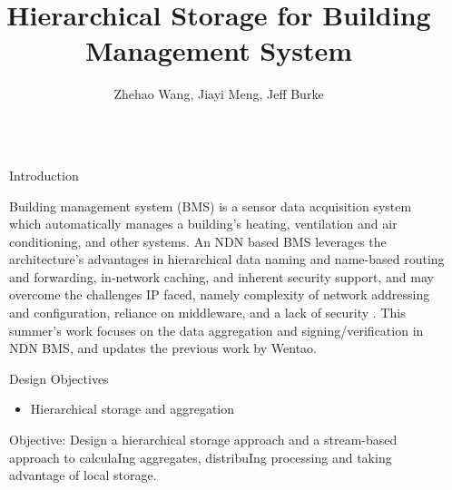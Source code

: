 \documentclass[final,hyperref={pdfpagelabels=false},20pt]{beamer}
\title{\huge Hierarchical Storage for Building Management System}
\author[AuthorNames]{Zhehao Wang\inst{1}, Jiayi Meng\inst{2}, Jeff Burke\inst{3}}
\institute[Institutes]{\inst{1} \inst{2} \inst{3} UCLA REMAP}
\begin{document}

\begin{frame}[t] %

\begin{columns}[t] %

\begin{column}{.02\textwidth}\end{column} %

\begin{column}{.465\textwidth} %


\begin{block}{Introduction}

Building management system (BMS) is a sensor data acquisition system which automatically manages a building's heating, ventilation and air conditioning, and other systems. \newline
An NDN based BMS leverages the architecture's advantages in hierarchical data naming and name-based routing and forwarding, in-network caching, and inherent security support, and may overcome the challenges IP faced, namely complexity of network addressing and configuration, reliance on middleware, and a lack of security \cite{wentao-bms}. \newline
This summer's work focuses on the data aggregation and signing/verification in NDN BMS, and updates the previous work by Wentao.

\end{block}


\begin{block}{Design Objectives}

\begin{itemize}
\item{Hierarchical storage and aggregation}
\end{itemize}
Objective: Design a hierarchical storage approach and a stream-based approach to calculaIng aggregates, distribuIng processing and taking advantage of local storage.


\end{block}
\end{column}
\end{columns}
\end{frame}
\end{document}
